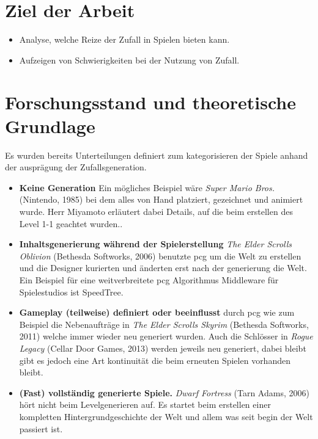 \documentclass[10pt,a4paper]{article}
\begin{document}
\section{Ziel der Arbeit}
\begin{itemize}
\item Analyse, welche Reize der Zufall in Spielen bieten kann.
\item Aufzeigen von Schwierigkeiten bei der Nutzung von Zufall.
\end{itemize}

\section{Forschungsstand und theoretische Grundlage}

Es wurden bereits Unterteilungen definiert zum kategorisieren der Spiele anhand der ausprägung der Zufallsgeneration\cite{VanderLinden2014}.
\begin{itemize}
\item \textbf{Keine Generation} Ein mögliches Beispiel wäre \textit{Super Mario Bros.} (Nintendo, 1985) bei dem alles von Hand platziert, gezeichnet und animiert wurde. Herr Miyamoto erläutert dabei Details, auf die beim erstellen des Level 1-1 geachtet wurden.\cite{EurogamerMiyamotoInterview}.
\item \textbf{Inhaltsgenerierung während der Spielerstellung} \textit{The Elder Scrolls Oblivion} (Bethesda Softworks, 2006) benutzte \gls{pcg} um die Welt zu erstellen und die Designer kurierten und änderten erst nach der generierung die Welt\cite{PCGamerCarterInterview}. Ein Beispiel für eine weitverbreitete \gls{pcg} Algorithmus Middleware für Spielestudios ist SpeedTree\cite{SpeedTree}.
\item \textbf{Gameplay (teilweise) definiert oder beeinflusst} durch \gls{pcg} wie zum Beispiel die Nebenaufträge in \textit{The Elder Scrolls Skyrim} (Bethesda Softworks, 2011) welche immer wieder neu generiert wurden\cite{Bertz2011}. Auch die Schlösser in \textit{Rogue Legacy} (Cellar Door Games, 2013) werden jeweils neu generiert, dabei bleibt gibt es jedoch eine Art kontinuität die beim erneuten Spielen vorhanden bleibt\cite{Stanton2013}.
\item \textbf{(Fast) vollständig generierte Spiele.} \textit{Dwarf Fortress} (Tarn Adams, 2006) hört nicht beim Levelgenerieren auf. Es startet beim erstellen einer kompletten Hintergrundgeschichte der Welt und allem was seit begin der Welt passiert ist\cite{Champandard2012}.
\end{itemize}
\end{document}
